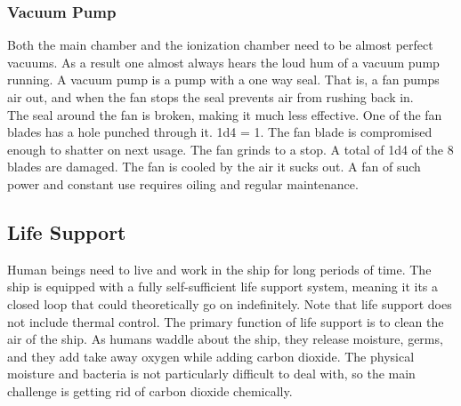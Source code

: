 \documentclass[a4paper]{article}
\begin{document}
\vspace{-0.5cm} \hspace{-18pt} \subsubsection{Vacuum Pump} \label{ray_vacuum_pump} \vspace{-0.2cm}
Both the main chamber and the ionization chamber need to be almost perfect vacuums. As a result one almost always hears the loud hum of a vacuum pump running. A vacuum pump is a pump with a one way seal. That is, a fan pumps air out, and when the fan stops the seal prevents air from rushing back in. 
\\ \pbhw
{The seal around the fan is broken, making it much less effective. One of the fan blades has a hole punched through it. \newline \hspace{-3pt} 1d4 = 1. The fan blade is compromised enough to shatter on next usage.}
{The fan grinds to a stop. A total of 1d4 of the 8 blades are damaged.}
{The fan is cooled by the air it sucks out.}
{A fan of such power and constant use requires oiling and regular maintenance.}


\newpage
\subsection{Life Support} \label{life}

Human beings need to live and work in the ship for long periods of time. The ship is equipped with a fully self-sufficient life support system, meaning it its a closed loop that could theoretically go on indefinitely. Note that life support does not include thermal control. The primary function of life support is to clean the air of the ship. As humans waddle about the ship, they release moisture, germs, and they add take away oxygen while adding carbon dioxide. The physical moisture and bacteria is not particularly difficult to deal with, so the main challenge is getting rid of carbon dioxide chemically.
\end{document}
